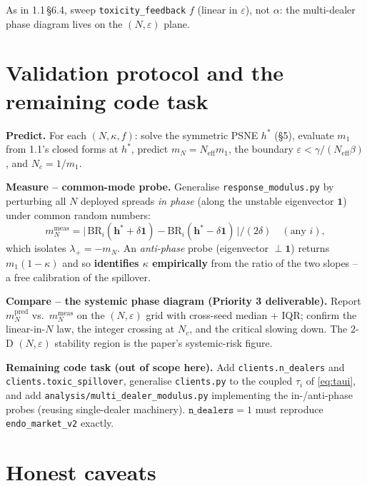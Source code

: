 \documentclass[11pt]{article}
\newcommand{\eps}{\varepsilon}
\newcommand{\code}[1]{\texttt{#1}}
\newcommand{\BR}{\mathrm{BR}}
\newcommand{\Neff}{N_{\mathrm{eff}}}
\newcommand{\bvh}{\bm{h}}
\newcommand{\ones}{\bm{1}}
\begin{document}
\noindent As in 1.1\,\S6.4, sweep \code{toxicity\_feedback} $f$ (linear in $\eps$),
not $\alpha$: the multi-dealer phase diagram lives on the $(N,\eps)$ plane.

\section{Validation protocol and the remaining code task}

\textbf{Predict.} For each $(N,\kappa,f)$: solve the symmetric PSNE $h^*$ (\S5),
evaluate $m_1$ from 1.1's closed forms at $h^*$, predict $m_N=\Neff m_1$, the
boundary $\eps<\gamma/(\Neff\beta)$, and $N_c=1/m_1$.

\textbf{Measure -- common-mode probe.} Generalise \code{response\_modulus.py} by
perturbing all $N$ deployed spreads \emph{in phase} (along the unstable eigenvector
$\ones$) under common random numbers:
%
\[
  m_N^{\mathrm{meas}} = \big|\,\BR_i(\bvh^*+\delta\ones)-\BR_i(\bvh^*-\delta\ones)\,\big|/(2\delta)
  \quad(\text{any }i),
\]
%
which isolates $\lambda_+=-m_N$. An \emph{anti-phase} probe (eigenvector $\perp\ones$)
returns $m_1(1-\kappa)$ and so \textbf{identifies $\kappa$ empirically} from the ratio
of the two slopes -- a free calibration of the spillover.

\textbf{Compare -- the systemic phase diagram (Priority 3 deliverable).} Report
$m_N^{\mathrm{pred}}$ vs.\ $m_N^{\mathrm{meas}}$ on the $(N,\eps)$ grid with cross-seed
median $+$ IQR; confirm the linear-in-$N$ law, the integer crossing at $N_c$, and the
critical slowing down. The $2$-D $(N,\eps)$ stability region is the paper's
systemic-risk figure.

\textbf{Remaining code task (out of scope here).} Add \code{clients.n\_dealers} and
\code{clients.toxic\_spillover}, generalise \code{clients.py} to the coupled $\tau_i$
of \eqref{eq:taui}, and add \code{analysis/multi\_dealer\_modulus.py} implementing the
in-/anti-phase probes (reusing single-dealer machinery). $\code{n\_dealers}=1$ must
reproduce \code{endo\_market\_v2} exactly.

\section{Honest caveats}
\end{document}
